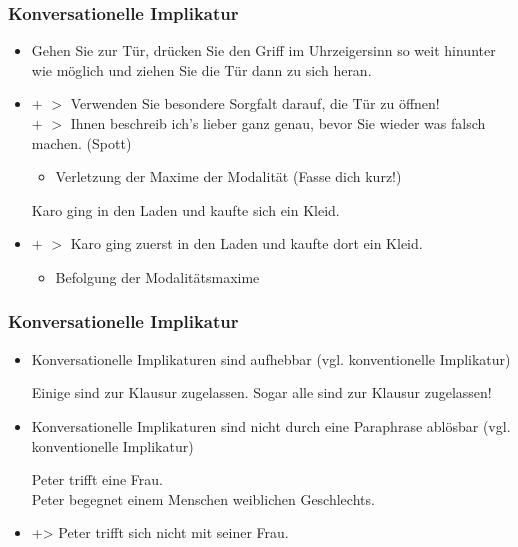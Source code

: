 \begin{frame}
\frametitle{Konversationelle Implikatur}

\begin{itemize}
	\item[]
	
	\ea Gehen Sie zur Tür, drücken Sie den Griff im Uhrzeigersinn so weit hinunter wie möglich und ziehen Sie die Tür dann zu sich heran.
	\z

	\item[] + $>$ Verwenden Sie besondere Sorgfalt darauf, die Tür zu öffnen!\\
+ $>$ Ihnen beschreib ich's lieber ganz genau, bevor Sie wieder was falsch machen. (Spott)

	\begin{itemize}
		\item Verletzung der Maxime der Modalität (Fasse dich kurz!)
	\end{itemize}
	
\vspace{1ex}
	
	\ea Karo ging in den Laden und kaufte sich ein Kleid.
	\z

	\item[] + $>$ Karo ging zuerst in den Laden und kaufte dort ein Kleid.

	\begin{itemize}
		\item Befolgung der Modalitätsmaxime
	\end{itemize}
	
\end{itemize}

\end{frame}



\begin{frame}
\frametitle{Konversationelle Implikatur}

\begin{itemize}
	\item Konversationelle Implikaturen sind aufhebbar (vgl. konventionelle Implikatur)
	
		\ea Einige sind zur Klausur zugelassen. Sogar alle sind zur Klausur zugelassen!
		\z
	
	\item Konversationelle Implikaturen sind nicht durch eine Paraphrase ablösbar (vgl. konventionelle Implikatur)
	
	\ea Peter trifft eine Frau.\\
Peter begegnet einem Menschen weiblichen Geschlechts.
	\z

	\item[] +> Peter trifft sich nicht mit seiner Frau.
	
\end{itemize}

\end{frame}


